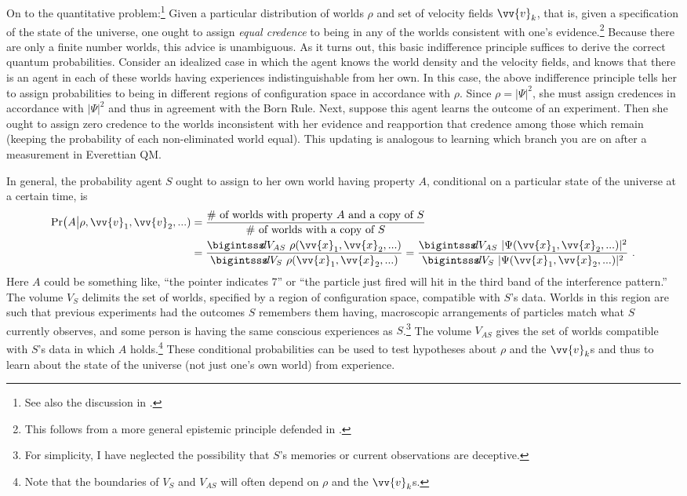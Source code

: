 \documentclass[12pt,secnumarabic,balancelastpage,amsmath,amssymb,nofootinbib]{article}
\begin{document}
On to the quantitative problem:\footnote{See also the discussion in \citet[]{bostrom2012}.} Given a particular distribution of worlds $\rho$ and set of velocity fields $\vv{v}_k$, that is, given a specification of the state of the universe, one ought to assign \emph{equal credence} to being in any of the worlds consistent with one's evidence.\footnote{This follows from a more general epistemic principle defended in \citet{elga2004}.}  Because there are only a finite number worlds, this advice is unambiguous.  As it turns out, this basic indifference principle suffices to derive the correct quantum probabilities.  Consider an idealized case in which the agent knows the world density and the velocity fields, and knows that there is an agent in each of these worlds having experiences indistinguishable from her own.  In this case, the above indifference principle tells her to assign probabilities to being in different regions of configuration space in accordance with $\rho$.  Since $\rho=|\Psi|^2$, she must assign credences in accordance with $|\Psi|^2$ and thus in agreement with the Born Rule.  Next, suppose this agent learns the outcome of an experiment.  Then she ought to assign zero credence to the worlds inconsistent with her evidence and reapportion that credence among those which remain (keeping the probability of each non-eliminated world equal).  This updating is analogous to learning which branch you are on after a measurement in Everettian QM.

In general, the probability agent $S$ ought to assign to her own world having property $A$, conditional on a particular state of the universe at a certain time, is
\begin{align}
\mbox{Pr}\big(A\big|\rho,\vv{v}_1, \vv{v}_2, ...)&=\frac{\mbox{\# of worlds with property }A\mbox{ and a copy of }S}{\mbox{\# of worlds with a copy of }S}
\nonumber
\\
&=\frac{\bigintsss\!\! d V_{AS} \ \rho(\vv{x}_1,\vv{x}_2,...)}{\bigintsss\!\! d V_S \ \rho(\vv{x}_1,\vv{x}_2,...)}=\frac{\bigintsss\!\! d V_{AS} \ |\Psi(\vv{x}_1,\vv{x}_2,...)|^2}{\bigintsss\!\! d V_S \ |\Psi(\vv{x}_1,\vv{x}_2,...)|^2}\ .
\end{align}
Here $A$ could be something like, ``the pointer indicates 7'' or ``the particle just fired will hit in the third band of the interference pattern.''  The volume $V_{S}$ delimits the set of worlds, specified by a region of configuration space, compatible with $S$'s data.  Worlds in this region are such that previous experiments had the outcomes $S$ remembers them having, macroscopic arrangements of particles match what $S$ currently observes, and some person is having the same conscious experiences as $S$.\footnote{For simplicity, I have neglected the possibility that $S$'s memories or current observations are deceptive.}  The volume $V_{AS}$ gives the set of worlds compatible with $S$'s data in which $A$ holds.\footnote{Note that the boundaries of $V_{S}$ and $V_{AS}$ will often depend on $\rho$ and the $\vv{v}_k$s.}  These conditional probabilities can be used to test hypotheses about $\rho$ and the $\vv{v}_k$s and thus to learn about the state of the universe (not just one's own world) from experience.
\end{document}
